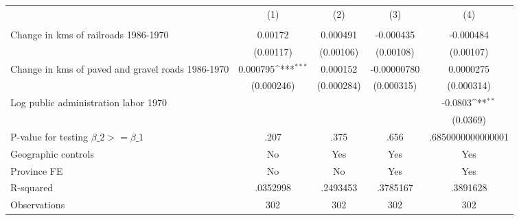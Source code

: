 {
\def\sym#1{\ifmmode^{#1}\else\(^{#1}\)\fi}
\begin{tabular}{l*{4}{c}}
\hline\hline
                &\multicolumn{1}{c}{(1)}&\multicolumn{1}{c}{(2)}&\multicolumn{1}{c}{(3)}&\multicolumn{1}{c}{(4)}\\
                &\multicolumn{1}{c}{}&\multicolumn{1}{c}{}&\multicolumn{1}{c}{}&\multicolumn{1}{c}{}\\
\hline
Change in kms of railroads 1986-1970&  0.00172         & 0.000491         &-0.000435         &-0.000484         \\
                &(0.00117)         &(0.00106)         &(0.00108)         &(0.00107)         \\
[1em]
Change in kms of paved and gravel roads 1986-1970& 0.000795\sym{***}& 0.000152         &-0.00000780         &0.0000275         \\
                &(0.000246)         &(0.000284)         &(0.000315)         &(0.000314)         \\
[1em]
Log public administration labor 1970&                  &                  &                  &  -0.0803\sym{**} \\
                &                  &                  &                  & (0.0369)         \\
\hline
P-value for testing $\beta\_{2} >= \beta\_{1}$&     .207         &     .375         &     .656         &.6850000000000001         \\
Geographic controls&       No         &      Yes         &      Yes         &      Yes         \\
Province FE     &       No         &       No         &      Yes         &      Yes         \\
R-squared       & .0352998         & .2493453         & .3785167         & .3891628         \\
Observations    &      302         &      302         &      302         &      302         \\
\hline\hline
\end{tabular}
}
